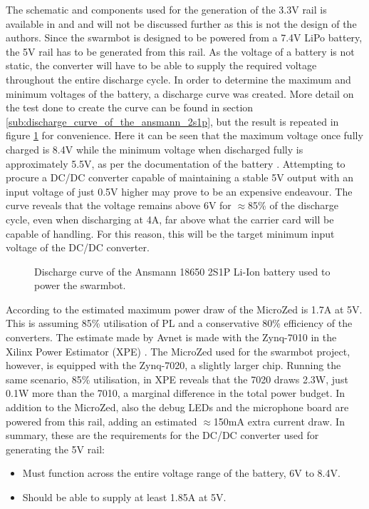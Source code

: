 The schematic and components used for the generation of the 3.3V rail is available in \cite{carrier_schematic} and \cite{ccschematic} and will not be discussed further as this is not the design of the authors.
Since the swarmbot is designed to be powered from a 7.4V LiPo battery, the 5V rail has to be generated from this rail.
As the voltage of a battery is not static, the converter will have to be able to supply the required voltage throughout the entire discharge cycle.
In order to determine the maximum and minimum voltages of the battery, a discharge curve was created.
More detail on the test done to create the curve can be found in section \ref{sub:discharge_curve_of_the_ansmann_2s1p}, but the result is repeated in figure \ref{fig:discharge_repeat} for convenience.
Here it can be seen that the maximum voltage once fully charged is 8.4V while the minimum voltage when discharged fully is approximately 5.5V, as per the documentation of the battery \cite{battery}.
Attempting to procure a DC/DC converter capable of maintaining a stable 5V output with an input voltage of just 0.5V higher may prove to be an expensive endeavour.
The curve reveals that the voltage remains above 6V for $\approx$85\% of the discharge cycle, even when discharging at 4A, far above what the carrier card will be capable of handling.
For this reason, this will be the target minimum input voltage of the DC/DC converter.
\begin{figure}
	\centering
	
	\caption{Discharge curve of the Ansmann 18650 2S1P Li-Ion battery used to power the swarmbot.}
	\label{fig:discharge_repeat}
\end{figure}
According to \cite{microzed_hardware_guide} the estimated maximum power draw of the MicroZed is 1.7A at 5V.
This is assuming 85\% utilisation of PL and a conservative 80\% efficiency of the converters.
The estimate made by Avnet is made with the Zynq-7010 in the Xilinx Power Estimator (XPE) \cite{xpe}.
The MicroZed used for the swarmbot project, however, is equipped with the Zynq-7020, a slightly larger chip.
Running the same scenario, 85\% utilisation, in XPE reveals that the 7020 draws 2.3W, just 0.1W more than the 7010, a marginal difference in the total power budget.
In addition to the MicroZed, also the debug LEDs and the microphone board are powered from this rail, adding an estimated $\approx$150mA extra current draw.
In summary, these are the requirements for the DC/DC converter used for generating the 5V rail:

\begin{itemize}
	\item Must function across the entire voltage range of the battery, 6V to 8.4V.
	\item Should be able to supply at least 1.85A at 5V.
\end{itemize}

